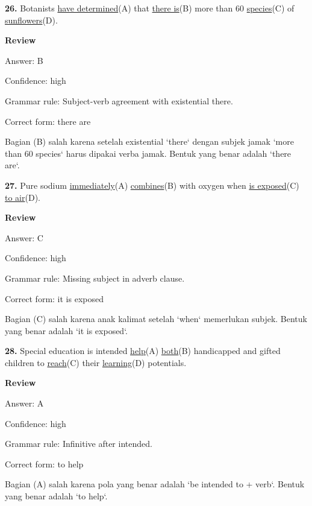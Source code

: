 \documentclass[12pt]{article}
\begin{document}
\endgroup
\par
\vspace{\questionblockgap}
\noindent\textbf{26.} Botanists \uline{have determined}(A) that \uline{there is}(B) more than 60 \uline{species}(C) of \uline{sunflowers}(D).
\par
\begingroup
\setlength{\parskip}{0pt}
\setlength{\parindent}{0pt}
\textbf{Review}\par
Answer: B\par
Confidence: high\par
Grammar rule: Subject-verb agreement with existential there.\par
Correct form: there are\par
Bagian (B) salah karena setelah existential `there` dengan subjek jamak `more than 60 species` harus dipakai verba jamak. Bentuk yang benar adalah `there are`.\par
\endgroup
\par
\vspace{\questionblockgap}
\noindent\textbf{27.} Pure sodium \uline{immediately}(A) \uline{combines}(B) with oxygen when \uline{is exposed}(C) \uline{to air}(D).
\par
\begingroup
\setlength{\parskip}{0pt}
\setlength{\parindent}{0pt}
\textbf{Review}\par
Answer: C\par
Confidence: high\par
Grammar rule: Missing subject in adverb clause.\par
Correct form: it is exposed\par
Bagian (C) salah karena anak kalimat setelah `when` memerlukan subjek. Bentuk yang benar adalah `it is exposed`.\par
\endgroup
\par
\vspace{\questionblockgap}
\noindent\textbf{28.} Special education is intended \uline{help}(A) \uline{both}(B) handicapped and gifted children to \uline{reach}(C) their \uline{learning}(D) potentials.
\par
\begingroup
\setlength{\parskip}{0pt}
\setlength{\parindent}{0pt}
\textbf{Review}\par
Answer: A\par
Confidence: high\par
Grammar rule: Infinitive after intended.\par
Correct form: to help\par
Bagian (A) salah karena pola yang benar adalah `be intended to + verb`. Bentuk yang benar adalah `to help`.\par
\end{document}
